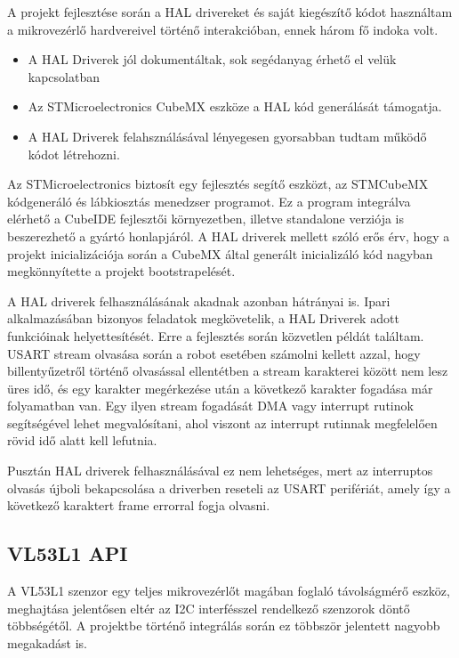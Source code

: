 A projekt fejlesztése során a HAL drivereket és saját kiegészítő kódot használtam
a mikrovezérlő hardvereivel történő interakcióban, ennek három fő indoka volt.

\begin{itemize}
  \setlength\itemsep{0em}
\item{A HAL Driverek jól dokumentáltak, sok segédanyag érhető el velük
  kapcsolatban}
\item{Az STMicroelectronics CubeMX eszköze a HAL kód generálását támogatja.}
\item{A HAL Driverek felahsználásával lényegesen gyorsabban tudtam működő kódot
  létrehozni.}
\end{itemize}

Az STMicroelectronics biztosít egy fejlesztés segítő eszközt, az STMCubeMX
kódgeneráló és lábkiosztás menedzser programot. Ez a program integrálva elérhető
a CubeIDE fejlesztői környezetben, illetve standalone verziója is beszerezhető a
gyártó honlapjáról. A HAL driverek mellett szóló erős érv, hogy a projekt
inicializációja során a CubeMX által generált inicializáló kód nagyban
megkönnyítette a projekt bootstrapelését.

\medskip

A HAL driverek felhasználásának akadnak azonban hátrányai is. Ipari
alkalmazásában bizonyos feladatok megkövetelik, a HAL Driverek adott funkcióinak
helyettesítését. Erre a fejlesztés során közvetlen példát találtam.  USART stream
olvasása során a robot esetében számolni kellett azzal, hogy billentyűzetről
történő olvasással ellentétben a stream karakterei között nem lesz üres idő, és
egy karakter megérkezése után a következő karakter fogadása már folyamatban
van. Egy ilyen stream fogadását DMA vagy interrupt rutinok segítségével lehet
megvalósítani, ahol viszont az interrupt rutinnak megfelelően rövid idő alatt
kell lefutnia.

Pusztán HAL driverek felhasználásával ez nem lehetséges, mert az interruptos
olvasás újboli bekapcsolása a driverben reseteli az USART perifériát, amely így a
következő karaktert frame errorral fogja olvasni.

\subsection{VL53L1 API}

A VL53L1 szenzor egy teljes mikrovezérlőt magában foglaló távolságmérő eszköz,
meghajtása jelentősen eltér az I2C interfésszel rendelkező szenzorok döntő
többségétől. A projektbe történő integrálás során ez többször jelentett nagyobb
megakadást is.

